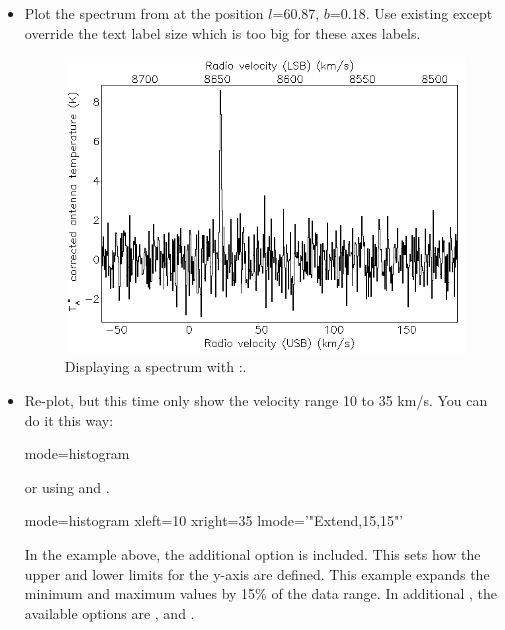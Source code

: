 \documentclass[11pt,oneside,chapters]{starlink}
\newcommand{\udeg}{\hspace{-0.3em}\dgs\hspace{-0.08em}}
\newcommand{\udeg}{\HCode{&deg}}
\begin{document}
\begin{itemize}
\item Plot the spectrum from  at the position
$l$=60.\udeg87, $b$=0.\udeg18. Use existing  except
override the text label size which is too big for these axes labels.
\begin{terminalv}
\end{terminalv}

\begin{figure}[h!]
\begin{center}
\includegraphics[width=0.55\linewidth]{sc20_display3}
\caption[Displaying a spectrum with \Kappa:\linplot.]{\label{fig:display3}
  Displaying a spectrum with \Kappa:\linplot.}
\end{center}
\end{figure}

\item Re-plot, but this time only show the velocity range 10 to 35
km/s. You can do it this way:
\begin{terminalv}
  mode=histogram
\end{terminalv}
or using  and .
\begin{terminalv}
  mode=histogram xleft=10 xright=35 lmode='"Extend,15,15"'
\end{terminalv}
In the example above, the additional option  is included.
This sets how the upper and lower limits for the y-axis are defined.
This example expands the minimum and maximum values by 15\% of the
data range. In additional , the available options are
,  and .


\end{itemize}
\end{document}
